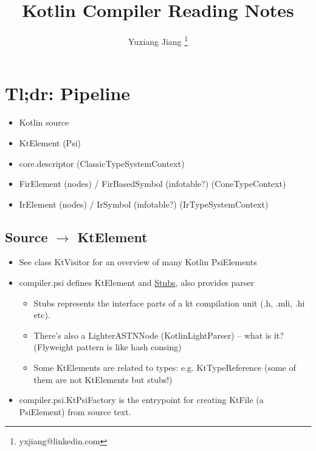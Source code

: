 \documentclass{article}
\begin{document}
\title{Kotlin Compiler Reading Notes}
\author{Yuxiang Jiang \thanks{yxjiang@linkedin.com}}
\maketitle

\newcommand{\textSafeTo}{\texorpdfstring{$\to$}{to} }

\tableofcontents

\section{Tl;dr: Pipeline}
\begin{itemize}
    \item Kotlin source
    \item KtElement (Psi)
    \item core.descriptor (ClassicTypeSystemContext)
    \item FirElement (nodes) / FirBasedSymbol (infotable?) (ConeTypeContext)
    \item IrElement (nodes) / IrSymbol (infotable?) (IrTypeSystemContext)
\end{itemize}

\subsection{Source \textSafeTo KtElement}

\begin{itemize}
    \item See class KtVisitor for an overview of many Kotlin PsiElements
    \item compiler.psi defines KtElement and \href{https://www.jetbrains.org/intellij/sdk/docs/basics/indexing_and_psi_stubs/stub_indexes.html}{Stubs}, also provides parser
    \begin{itemize}
        \item Stubs represents the interface parts of a kt compilation unit
        (.h, .mli, .hi etc).
        \item There's also a LighterASTNNode (KotlinLightParser) -- what is it? (Flyweight pattern is like hash consing)
        \item Some KtElements are related to types: e.g. KtTypeReference (some of them are not KtElements but stubs!)
    \end{itemize}
    \item compiler.psi.KtPsiFactory is the entrypoint for creating KtFile (a PsiElement) from source text.
\end{itemize}
\end{document}
